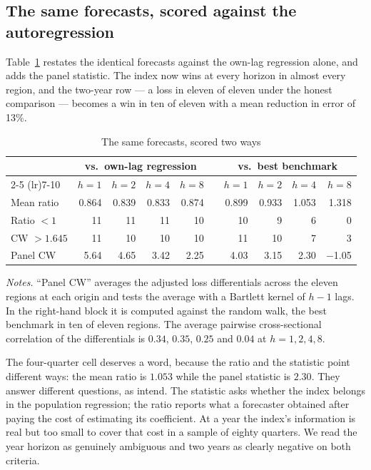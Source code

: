 \documentclass[12pt]{article}
\begin{document}
\subsection{The same forecasts, scored against the autoregression}

Table~\ref{tab:contrast} restates the identical forecasts against the own-lag
regression alone, and adds the panel statistic. The index now wins at every
horizon in almost every region, and the two-year row --- a loss in eleven of
eleven under the honest comparison --- becomes a win in ten of eleven with a
mean reduction in error of 13\%.

\begin{table}[htbp]
\centering
\caption{The same forecasts, scored two ways}
\label{tab:contrast}
\begin{tabular}{lrrrrcrrrr}
\toprule
& \multicolumn{4}{c}{vs.\ own-lag regression} & & \multicolumn{4}{c}{vs.\ best benchmark} \\
\cmidrule(lr){2-5} \cmidrule(lr){7-10}
& $h{=}1$ & $h{=}2$ & $h{=}4$ & $h{=}8$ & & $h{=}1$ & $h{=}2$ & $h{=}4$ & $h{=}8$ \\
\midrule
Mean ratio       & 0.864 & 0.839 & 0.833 & 0.874 & & 0.899 & 0.933 & 1.053 & 1.318 \\
Ratio $<1$       & 11 & 11 & 11 & 10 & & 10 & 9 & 6 & 0 \\
CW $> 1.645$     & 11 & 10 & 10 & 10 & & 11 & 10 & 7 & 3 \\
Panel CW         & 5.64 & 4.65 & 3.42 & 2.25 & & 4.03 & 3.15 & 2.30 & $-$1.05 \\
\bottomrule
\end{tabular}

\vspace{0.5em}
\begin{minipage}{0.95\textwidth}
\footnotesize \textit{Notes.} ``Panel CW'' averages the adjusted loss
differentials across the eleven regions at each origin and tests the average
with a Bartlett kernel of $h-1$ lags. In the right-hand block it is computed
against the random walk, the best benchmark in ten of eleven regions. The
average pairwise cross-sectional correlation of the differentials is $0.34$,
$0.35$, $0.25$ and $0.04$ at $h = 1, 2, 4, 8$.
\end{minipage}
\end{table}

The four-quarter cell deserves a word, because the ratio and the statistic
point different ways: the mean ratio is $1.053$ while the panel statistic is
$2.30$. They answer different questions, as \citet{clark2007} intend. The
statistic asks whether the index belongs in the population regression; the
ratio reports what a forecaster obtained after paying the cost of estimating
its coefficient. At a year the index's information is real but too small to
cover that cost in a sample of eighty quarters. We read the year horizon as
genuinely ambiguous and two years as clearly negative on both criteria.
\end{document}
